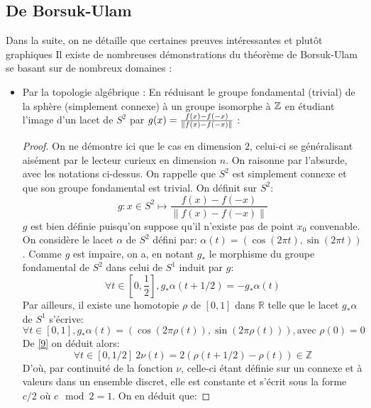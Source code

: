 \documentclass{cours}
\begin{document}
\subsection{De Borsuk-Ulam}
Dans la suite, on ne détaille que certaines preuves intéressantes et plutôt graphiques
Il existe de nombreuses démonstrations du théorème de Borsuk-Ulam se basant sur de nombreux domaines :
\begin{itemize}
    \item Par la topologie algébrique : En réduisant le groupe fondamental (trivial) de la sphère (simplement connexe) à un groupe isomorphe à $\mathbb{Z}$ en étudiant l'image d'un lacet de $S^{2}$ par $g(x) = \frac{f(x) - f(-x)}{\left\lVert f(x) - f(-x) \right\rVert}$ :
          \begin{proof}
              On ne démontre ici que le cas en dimension $2$, celui-ci se généralisant aisément par le lecteur curieux en dimension $n$. On raisonne par l'absurde, avec les notations ci-dessus.
              On rappelle que $S^{2}$ est simplement connexe et que son groupe fondamental est trivial.
              On définit sur $S^{2}$:
              \[g: x \in S^{2} \mapsto \frac{f(x)-f(-x)}{\left\lVert f(x) - f(-x)\right\rVert}\]
              $g$ est bien définie puisqu'on suppose qu'il n'existe pas de point $x_{0}$ convenable. On considère le lacet $\alpha$ de $S^{2}$ défini par: $\alpha(t) = (\cos{(2\pi t)}, \sin{(2\pi t)})$.
              Comme $g$ est impaire, on a, en notant $g_{*}$ le morphisme du groupe fondamental de $S^{2}$ dans celui de $S^{1}$ induit par $g$:
              \begin{equation}
                  \label{9}
                  \forall t \in \left[0, \frac{1}{2}\right], g_{*}\alpha(t + 1/2) = -g_{*}\alpha(t)
              \end{equation}
              Par ailleurs, il existe une homotopie $\rho$ de $\left[0, 1\right]$ dans $\mathbb{R}$ telle que le lacet $g_{*}\alpha$ de $S^{1}$ s'écrive:
              \begin{equation*}
                  \forall t \in \left[0, 1\right], g_{*}\alpha(t) = (\cos{(2\pi \rho(t))}, \sin{(2\pi \rho(t))}), \text{avec } \rho(0) = 0
              \end{equation*}
              De \eqref{9} on déduit alors:
              \begin{equation*}
                  \forall t \in \left[0, 1/2\right] \ 2\nu(t) = 2(\rho(t + 1/2) - \rho(t)) \in \mathbb{Z}
              \end{equation*}
              D'où, par continuité de la fonction $\nu$, celle-ci étant définie sur un connexe et à valeurs dans un ensemble discret, elle est constante et s'écrit sous la forme $c/2$ où $c\mod 2 = 1$. On en déduit que:

\end{proof}
\end{itemize}
\end{document}
